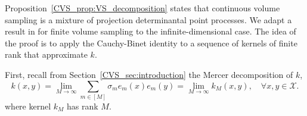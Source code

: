 \documentclass[twoside,11pt]{book}
\numberwithin{theorem}{chapter}
\numberwithin{definition}{chapter}
\numberwithin{proposition}{chapter}
\numberwithin{corollary}{chapter}
\numberwithin{example}{chapter}
\numberwithin{lemma}{chapter}
\numberwithin{assumption}{chapter}
\numberwithin{equation}{chapter}
\numberwithin{figure}{chapter}
\begin{document}
Proposition~\ref{CVS_prop:VS_decomposition} states that continuous volume sampling is a mixture of projection determinantal point processes. We adapt a result in \citep[Chapter 5]{KuTa12} for finite volume sampling to the infinite-dimensional case. The idea of the proof is to apply the Cauchy-Binet identity to a sequence of kernels of finite rank that approximate $k$.

First, recall from Section~\ref{CVS_sec:introduction} the Mercer decomposition of $k$,
\begin{equation}\label{CVS_eq:Mercer_decomposition_1}
k(x,y) = \lim_{M\rightarrow \infty}\sum\limits_{m\in [M]} \sigma_{m} e_{m}(x)e_{m}(y) = \lim_{M\rightarrow \infty} k_M(x,y), \quad\forall x,y\in\mathcal{X}.
\end{equation}
where kernel $k_M$ has rank $M$.
\end{document}
